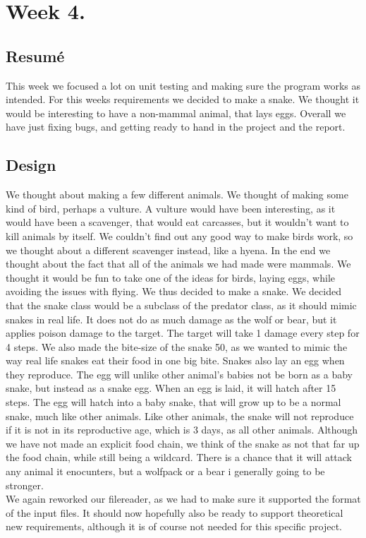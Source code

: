 \documentclass[11pt]{article}
\begin{document}
    \section*{Week 4.}
    \subsection*{Resumé}
    This week we focused a lot on unit testing and making sure the program works as intended. For this weeks requirements we decided to make a snake. We thought it would be 
    interesting to have a non-mammal animal, that lays eggs. Overall we have just fixing bugs, and getting ready to hand in the project and the report. 
    \subsection*{Design}
    We thought about making a few different animals. We thought of making some kind of bird, perhaps a vulture. A vulture would have been interesting, 
    as it would have been a scavenger, that would eat carcasses, but it wouldn't want to kill animals by itself. We couldn't find out any good way to make birds 
    work, so we thought about a different scavenger instead, like a hyena. In the end we thought about the fact that all of the animals we had made were mammals. 
    We thought it would be fun to take one of the ideas for birds, laying eggs, while avoiding the issues with flying. We thus decided to make a snake. 
    We decided that the snake class would be a subclass of the predator class, as it should mimic snakes in real life. It does not do as much damage as the wolf or bear, 
    but it applies poison damage to the target. The target will take 1 damage every step for 4 steps. We also made the bite-size of the snake 50, as we wanted to mimic the way real 
    life snakes eat their food in one big bite. 
    Snakes also lay an egg when they reproduce. The egg will unlike other animal's babies not be born as a baby snake, but instead as a snake egg. When an egg is laid, it will 
    hatch after 15 steps. The egg will hatch into a baby snake, that will grow up to be a normal snake, much like other animals. Like other animals, the snake will not reproduce 
    if it is not in its reproductive age, which is 3 days, as all other animals. 
    Although we have not made an explicit food chain, we think of the snake as not that far up the food chain, while still being a wildcard. There is a chance that it will attack 
    any animal it enocunters, but a wolfpack or a bear i generally going to be stronger. 
    \\
    We again reworked our filereader, as we had to make sure it supported the format of the input files. 
    It should now hopefully also be ready to support theoretical new requirements, although it is of course not needed for this specific project. 
\end{document}
